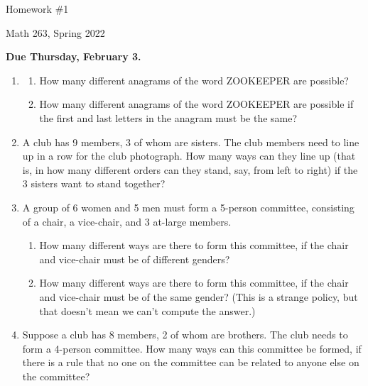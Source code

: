 \documentclass{article}
\begin{document}
\begin{center}
\LARGE
Homework \#1
\normalsize

\bigskip
Math 263, Spring 2022

{\bf Due Thursday, February 3.}

\bigskip
\end{center}


\normalsize

\begin{enumerate}

\item
\begin{enumerate}
\item How many different anagrams of the word ZOOKEEPER are possible?
\item How many different anagrams of the word ZOOKEEPER are possible if the first and last letters in the anagram must be the same?
\end{enumerate}


\bigskip

\item A club has 9 members, 3 of whom are sisters. The club members need to line up in a row for the club photograph. How many ways can they line up (that is, in how many different orders can they stand, say, from left to right) if the 3 sisters want to stand together?


\bigskip


\item A group of 6 women and 5 men must form a 5-person committee, consisting of a chair, a vice-chair, and 3 at-large members. 
\begin{enumerate} 
\item How many different ways are there to form this committee, if the chair and vice-chair must be of different genders? 
\item How many different ways are there to form this committee, if the chair and vice-chair must be of the same gender? (This is a strange policy, but that doesn't mean we can't compute the answer.)
\end{enumerate}
\bigskip


\item Suppose a club has 8 members, 2 of whom are brothers. The club needs to form a 4-person committee. How many ways can this committee be formed, if there is a rule that no one on the committee can be related to anyone else on the committee?

\bigskip


\end{enumerate}
\end{document}
